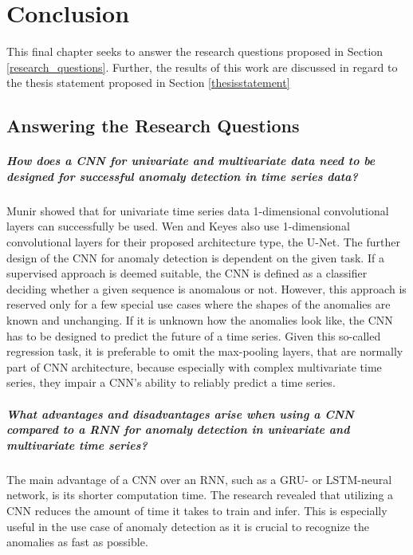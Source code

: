 \chapter{Conclusion}

This final chapter seeks to answer the research questions proposed in Section \ref{research_questions}. Further, the results of this work are discussed in regard to the thesis statement proposed in Section \ref{thesisstatement}

\section{Answering the Research Questions}


\paragraph{How does a CNN for univariate and multivariate data need to be designed for successful anomaly detection in time series data?}

Munir \parencite*{Munir2019} showed that for univariate time series data 1-dimensional convolutional layers can successfully be used. Wen and Keyes \parencite*{Wen2019} also use 1-dimensional convolutional layers for their proposed architecture type, the U-Net. The further design of the CNN for anomaly detection is dependent on the given task. If a supervised approach is deemed suitable, the CNN is defined as a classifier deciding whether a given sequence is anomalous or not. However, this approach is reserved only for a few special use cases where the shapes of the anomalies are known and unchanging. If it is unknown how the anomalies look like, the CNN has to be designed to predict the future of a time series. Given this so-called regression task, it is preferable to omit the max-pooling layers, that are normally part of CNN architecture, because especially with complex multivariate time series, they impair a CNN's ability to reliably predict a time series.  

\paragraph{What advantages and disadvantages arise when using a CNN compared to a RNN for anomaly detection in univariate and multivariate time series?} The main advantage of a CNN over an RNN, such as a GRU- or LSTM-neural network, is its shorter computation time. The research revealed that utilizing a CNN reduces the amount of time it takes to train and infer. This is especially useful in the use case of anomaly detection as it is crucial to recognize the anomalies as fast as possible.

